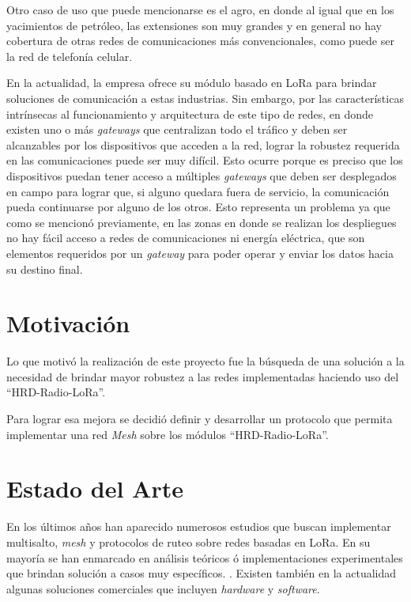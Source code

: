 Otro caso de uso que puede mencionarse es el agro, en donde al igual que en los yacimientos de petróleo, las extensiones son muy grandes y en general no hay cobertura de otras redes de comunicaciones más convencionales, como puede ser la red de telefonía celular.

En la actualidad, la empresa ofrece su módulo basado en LoRa para brindar soluciones de comunicación a estas industrias. Sin embargo, por las características intrínsecas al funcionamiento y arquitectura de este tipo de redes, en donde existen uno o más \emph{gateways} que centralizan todo el tráfico y deben ser alcanzables por los dispositivos que acceden a la red,  lograr la robustez requerida en las comunicaciones puede ser muy difícil. Esto ocurre porque es preciso que los dispositivos puedan tener acceso a múltiples \emph{gateways} que deben ser desplegados en campo para lograr que, si alguno quedara fuera de servicio, la comunicación pueda continuarse por alguno de los otros. Esto representa un problema ya que como se mencionó previamente, en las zonas en donde se realizan los despliegues no hay fácil acceso a redes de comunicaciones ni energía eléctrica, que son elementos requeridos por un \emph{gateway} para poder operar y enviar los datos hacia su destino final.


\section{Motivación}

Lo que motivó la realización de este proyecto fue la búsqueda de una solución a la necesidad de brindar mayor robustez a las redes implementadas haciendo uso del “HRD-Radio-LoRa”. \citep{WEBSITE:5}

Para lograr esa mejora se decidió definir y desarrollar un protocolo que permita implementar una red \emph{Mesh} sobre los módulos “HRD-Radio-LoRa”.


\section{Estado del Arte}

En los últimos años han aparecido numerosos estudios que buscan implementar multisalto, \emph{mesh} y protocolos de ruteo sobre redes basadas en LoRa. En su mayoría se han enmarcado en análisis teóricos ó implementaciones experimentales que brindan solución a casos muy específicos. \citep{WEBSITE:1} \citep{WEBSITE:2}\citep{WEBSITE:3}. Existen también en la actualidad algunas soluciones comerciales que incluyen \emph{hardware} y \emph{software}.\citep{WEBSITE:4} 

